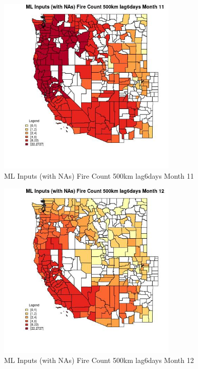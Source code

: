 \begin{figure} 
\centering  
\includegraphics[width=0.77\textwidth]{Code_Outputs/Report_ML_input_PM25_Step4_part_f_de_duplicated_aves_prioritize_24hr_obswNAs_CountyFire_Count_500km_lag6daysmedianMonth11.jpg} 
\caption{\label{fig:Report_ML_input_PM25_Step4_part_f_de_duplicated_aves_prioritize_24hr_obswNAsCountyFire_Count_500km_lag6daysmedianMonth11}ML Inputs (with NAs) Fire Count 500km lag6days Month 11} 
\end{figure} 
 

\begin{figure} 
\centering  
\includegraphics[width=0.77\textwidth]{Code_Outputs/Report_ML_input_PM25_Step4_part_f_de_duplicated_aves_prioritize_24hr_obswNAs_CountyFire_Count_500km_lag6daysmedianMonth12.jpg} 
\caption{\label{fig:Report_ML_input_PM25_Step4_part_f_de_duplicated_aves_prioritize_24hr_obswNAsCountyFire_Count_500km_lag6daysmedianMonth12}ML Inputs (with NAs) Fire Count 500km lag6days Month 12} 
\end{figure} 
 

